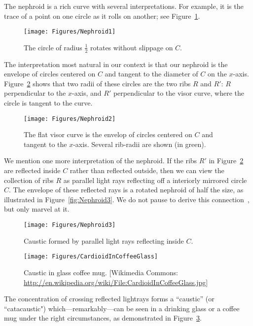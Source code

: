 \pdfoutput=1  \documentclass[]{article}
\newcommand{\figlab}[1]{\label{fig:#1}}
\newcommand{\figref}[1]{\ref{fig:#1}}
\begin{document}
The nephroid is a rich curve with several interpretations.
For example, it is the trace of a point on one circle as it rolls on another;
see Figure~\figref{Nephroid1}.
\begin{figure}[htbp]
\centering
\texttt{[image: Figures/Nephroid1]}
\caption{The circle of radius $\frac{1}{2}$ rotates without slippage on $C$.}
\figlab{Nephroid1}
\end{figure}


The interpretation most natural in our context is that our nephroid is
the envelope of circles centered on 
$C$ and tangent to the diameter of $C$ on the $x$-axis.
Figure~\figref{Nephroid2} shows that two radii of these circles are the two ribs $R$ and $R'$:
$R$ perpendicular to the $x$-axis, and $R'$ perpendicular to the visor curve, where
the circle is tangent to the curve.
\begin{figure}[htbp]
\centering
\texttt{[image: Figures/Nephroid2]}
\caption{The flat visor curve is the envelop of circles centered on $C$ and tangent to
the $x$-axis. Several rib-radii are shown (in green).}
\figlab{Nephroid2}
\end{figure}


We mention one more interpretation of the nephroid.  If the ribs $R'$ in
Figure~\figref{Nephroid2} are reflected inside $C$ rather than reflected outside,
then we can view the collection of ribs $R$ as parallel light rays reflecting
off a interiorly mirrored circle $C$.  The envelope of these reflected rays is
a rotated nephroid of half the size, as illustrated in
Figure~\figref{Nephroid3}.  
We do not pause to derive this connection~\cite[p.~158]{w-pdcig-91}, but
only marvel at it.
\begin{figure}[htbp]
\begin{minipage}[h]{\linewidth}
\centering
\texttt{[image: Figures/Nephroid3]}
\caption{Caustic formed by parallel light rays reflecting inside $C$.}
\figlab{Nephroid3}
\vspace{24pt}
\centering
\texttt{[image: Figures/CardioidInCoffeeGlass]}
\caption{Caustic in glass coffee mug.  
[Wikimedia Commons:
\protect\url{http://en.wikipedia.org/wiki/File:CardioidInCoffeeGlass.jpg}]
}
\figlab{CardioidInCoffeeGlass}
\end{minipage}
\end{figure}
The concentration of crossing reflected lightrays forms a ``caustic'' (or ``catacaustic")
which---remarkably---can be seen
in a drinking glass or a coffee mug
under the right circumstances,
as demonstrated in
Figure~\figref{CardioidInCoffeeGlass}.
\end{document}
